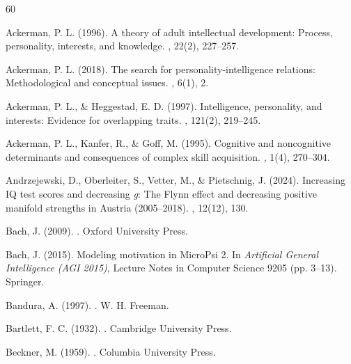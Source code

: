 \documentclass[12pt,a4paper]{article}
\begin{document}
\begin{thebibliography}{60}

Ackerman, P. L. (1996).
\newblock A theory of adult intellectual development: Process, personality, interests, and knowledge.
, 22(2), 227--257.

Ackerman, P. L. (2018).
\newblock The search for personality-intelligence relations: Methodological and conceptual issues.
, 6(1), 2.

Ackerman, P. L., \& Heggestad, E. D. (1997).
\newblock Intelligence, personality, and interests: Evidence for overlapping traits.
, 121(2), 219--245.

Ackerman, P. L., Kanfer, R., \& Goff, M. (1995).
\newblock Cognitive and noncognitive determinants and consequences of complex skill acquisition.
, 1(4), 270--304.

Andrzejewski, D., Oberleiter, S., Vetter, M., \& Pietschnig, J. (2024).
\newblock Increasing IQ test scores and decreasing \emph{g}: The Flynn effect and decreasing positive manifold strengths in Austria (2005--2018).
, 12(12), 130.

Bach, J. (2009).
.
\newblock Oxford University Press.

Bach, J. (2015).
\newblock Modeling motivation in MicroPsi 2.
\newblock In {\em Artificial General Intelligence (AGI 2015)}, Lecture Notes in Computer Science 9205 (pp. 3--13). Springer.

Bandura, A. (1997).
.
\newblock W. H. Freeman.

Bartlett, F. C. (1932).
.
\newblock Cambridge University Press.

Beckner, M. (1959).
.
\newblock Columbia University Press.


\end{thebibliography}
\end{document}
